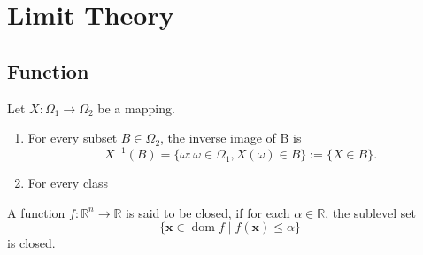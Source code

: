 \chapter{Limit Theory}

\section{Function}

\begin{definition}[Mapping]
    Let $X:\Omega_1\rightarrow\Omega_2$ be a mapping.
    \begin{enumerate}
        \item
              For every subset $B\in\Omega_2$, the inverse image of B is
              \begin{equation*}
                  X^{-1}(B)=\{\omega:\omega\in\Omega_1,X(\omega)\in B\}:=\{X\in B\}.
              \end{equation*}
        \item
              For every class
    \end{enumerate}
\end{definition}

\begin{definition} \label{def:closed-function}
    A function $f:\mathbb{R}^{n}\rightarrow\mathbb{R}$ is said to be closed, if for each $\alpha\in\mathbb{R}$, the sublevel set
    \begin{equation}
        \{\mathbf{x}\in\operatorname{dom}f\mid f(\mathbf{x})\leq\alpha\}
    \end{equation}
    is closed.
\end{definition}
